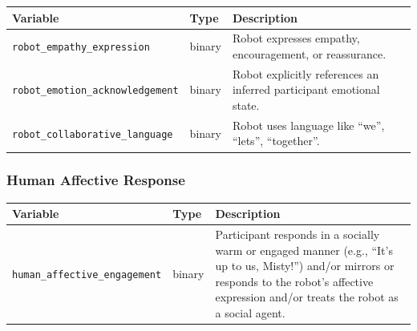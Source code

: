 \documentclass[
]{article}
\newcounter{none} %
\begin{document}
{\def\LTcaptype{none} %
\begin{longtable}[]{@{}
  >{\raggedright\arraybackslash}p{}
  >{\raggedright\arraybackslash}p{}
  >{\raggedright\arraybackslash}p{}@{}}
\toprule\noalign{}
\begin{minipage}[b]{\linewidth}\raggedright
Variable
\end{minipage} & \begin{minipage}[b]{\linewidth}\raggedright
Type
\end{minipage} & \begin{minipage}[b]{\linewidth}\raggedright
Description
\end{minipage} \\
\midrule\noalign{}
\endhead
\bottomrule\noalign{}
\endlastfoot
\texttt{robot\_empathy\_expression} & binary & Robot expresses empathy,
encouragement, or reassurance. \\
\texttt{robot\_emotion\_acknowledgement} & binary & Robot explicitly
references an inferred participant emotional state. \\
\texttt{robot\_collaborative\_language} & binary & Robot uses language
like ``we'', ``lets'', ``together''. \\
\end{longtable}
}

\subsubsection*{Human Affective
Response}\label{human-affective-response}

{\def\LTcaptype{none} %
\begin{longtable}[]{@{}
  >{\raggedright\arraybackslash}p{}
  >{\raggedright\arraybackslash}p{}
  >{\raggedright\arraybackslash}p{}@{}}
\toprule\noalign{}
\begin{minipage}[b]{\linewidth}\raggedright
Variable
\end{minipage} & \begin{minipage}[b]{\linewidth}\raggedright
Type
\end{minipage} & \begin{minipage}[b]{\linewidth}\raggedright
Description
\end{minipage} \\
\midrule\noalign{}
\endhead
\bottomrule\noalign{}
\endlastfoot
\texttt{human\_affective\_engagement} & binary & Participant responds in
a socially warm or engaged manner (e.g., ``It's up to us, Misty!'')
and/or mirrors or responds to the robot's affective expression and/or
treats the robot as a social agent. \\
\end{longtable}
}
\end{document}
